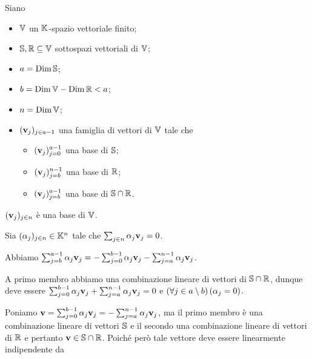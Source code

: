 \begin{Theorem}
  Siano
  \begin{itemize}
    \item $\mathbb{V}$ un $\mathbb{K}$-spazio vettoriale finito;
    \item $\mathbb{S}, \mathbb{R} \subseteq \mathbb{V}$
      sottospazi vettoriali di $\mathbb{V}$;
    \item $a = \operatorname{Dim}{\mathbb{S}}$;
    \item $b = \operatorname{Dim}{\mathbb{V}}
              - \operatorname{Dim}{\mathbb{R}} < a$;
    \item $n = \operatorname{Dim}{\mathbb{V}}$;
    \item $(\mathbf{v}_j)_{j \in a - 1}$ una
      famiglia di vettori di $\mathbb{V}$ tale che
      \begin{itemize}
        \item $(\mathbf{v}_j)_{j = 0}^{a - 1}$ una
          base di $\mathbb{S}$;
        \item $(\mathbf{v}_j)_{j = b}^{n - 1}$
          una base di $\mathbb{R}$;
        \item $(\mathbf{v}_j)_{j = b}^{a - 1}$ una
          base di $\mathbb{S} \cap \mathbb{R}$.
      \end{itemize}
  \end{itemize}
  $(\mathbf{v}_j)_{j \in n}$ \`e una base di
  $\mathbb{V}$.
\end{Theorem}
\Proof Sia
$(\alpha_j)_{j \in n} \in \mathbb{K}^n$ tale che
$\sum_{j \in n} \alpha_j\mathbf{v}_j = 0$.
\par Abbiamo
$\sum_{j = b}^{a - 1} \alpha_j\mathbf{v}_j =
- \sum_{j = 0}^{b - 1} \alpha_j\mathbf{v}_j
- \sum_{j = a}^{n - 1} \alpha_j\mathbf{v}_j$.
\par A primo membro abbiamo una combinazione lineare di vettori di
$\mathbb{S} \cap \mathbb{R}$, dunque deve essere
$\sum_{j = 0}^{b - 1} \alpha_j\mathbf{v}_j
+ \sum_{j = a}^{n - 1} \alpha_j\mathbf{v}_j = 0$ e
$\left ( \forall j \in a \setminus b \right ) \left ( \alpha_j = 0 \right )$.
\par Poniamo
$\mathbf{v} = \sum_{j = 0}^{b - 1} \alpha_j\mathbf{v}_j
= - \sum_{j = a}^{n - 1} \alpha_j\mathbf{v}_j$,
ma il primo membro \`e una combinazione lineare di vettori
$\mathbb{S}$ e il secondo una combinazione lineare di vettori di
$\mathbb{R}$ e pertanto
$\mathbf{v} \in \mathbb{S} \cap \mathbb{R}$.
Poich\'e per\`o tale vettore deve essere linearmente indipendente da
